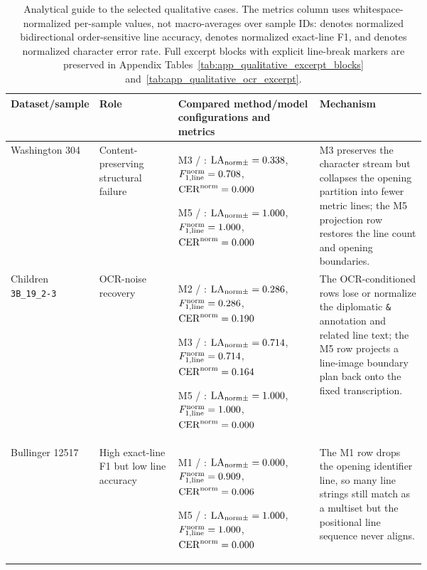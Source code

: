 \providecommand{\excerptnl}{\mbox{\texttt{\textbackslash n}}}
\begin{table}[!htbp]
  \centering
  \caption{Analytical guide to the selected qualitative cases. The metrics column uses whitespace-normalized per-sample values, not macro-averages over sample IDs: \LANormCombined{} denotes normalized bidirectional order-sensitive line accuracy, \LineFOneNorm{} denotes normalized exact-line F1, and \CERNorm{} denotes normalized character error rate. Full excerpt blocks with explicit line-break markers are preserved in Appendix Tables~\ref{tab:app_qualitative_excerpt_blocks} and~\ref{tab:app_qualitative_ocr_excerpt}.}
  \label{tab:exp_linebreak_comparison}
  \scriptsize
  \renewcommand{\arraystretch}{1.08}
  \setlength{\tabcolsep}{2pt}
  \begin{tabularx}{\linewidth}{@{}>{\raggedright\arraybackslash}p{0.15\linewidth}>{\raggedright\arraybackslash}p{0.19\linewidth}>{\raggedright\arraybackslash}p{0.34\linewidth}Y@{}}
    \toprule
    \textbf{Dataset/sample} & \textbf{Role} & \textbf{Compared method/model configurations and metrics} & \textbf{Mechanism} \\
    \midrule
    Washington 304 & Content-preserving structural failure & M3 / \GPTFiveMarchShort{}: \(\mathrm{LA}_{\mathrm{norm}\pm}=0.338\), \(F_{1,\mathrm{line}}^{\mathrm{norm}}=0.708\), \(\mathrm{CER}^{\mathrm{norm}}=0.000\)\par M5 / \GPTFiveShort{}: \(\mathrm{LA}_{\mathrm{norm}\pm}=1.000\), \(F_{1,\mathrm{line}}^{\mathrm{norm}}=1.000\), \(\mathrm{CER}^{\mathrm{norm}}=0.000\) & M3 preserves the character stream but collapses the opening partition into fewer metric lines; the M5 projection row restores the line count and opening boundaries. \\
    \addlinespace[0.35em]
    Children \texttt{3B\_19\_2-3} & OCR-noise recovery & M2 / \GPTFiveMarchShort{}: \(\mathrm{LA}_{\mathrm{norm}\pm}=0.286\), \(F_{1,\mathrm{line}}^{\mathrm{norm}}=0.286\), \(\mathrm{CER}^{\mathrm{norm}}=0.190\)\par M3 / \GPTFiveMarchShort{}: \(\mathrm{LA}_{\mathrm{norm}\pm}=0.714\), \(F_{1,\mathrm{line}}^{\mathrm{norm}}=0.714\), \(\mathrm{CER}^{\mathrm{norm}}=0.164\)\par M5 / \GPTFiveShort{}: \(\mathrm{LA}_{\mathrm{norm}\pm}=1.000\), \(F_{1,\mathrm{line}}^{\mathrm{norm}}=1.000\), \(\mathrm{CER}^{\mathrm{norm}}=0.000\) & The OCR-conditioned rows lose or normalize the diplomatic \texttt{\&} annotation and related line text; the M5 row projects a line-image boundary plan back onto the fixed transcription. \\
    \addlinespace[0.35em]
    Bullinger 12517 & High exact-line F1 but low line accuracy & M1 / \GPTFiveMarchShort{}: \(\mathrm{LA}_{\mathrm{norm}\pm}=0.000\), \(F_{1,\mathrm{line}}^{\mathrm{norm}}=0.909\), \(\mathrm{CER}^{\mathrm{norm}}=0.006\)\par M5 / \GPTFiveShort{}: \(\mathrm{LA}_{\mathrm{norm}\pm}=1.000\), \(F_{1,\mathrm{line}}^{\mathrm{norm}}=1.000\), \(\mathrm{CER}^{\mathrm{norm}}=0.000\) & The M1 row drops the opening identifier line, so many line strings still match as a multiset but the positional line sequence never aligns. \\

\end{tabularx}
\end{table}

